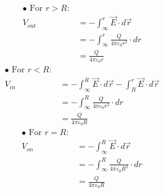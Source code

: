 	  \begin{align*}
	\bullet\text { For } r>R:\\
	V_{out}&=-\int_{\infty}^{r} \vec{E}\cdot d \vec{r}\\
	&=-\int_{\infty}^{r} \frac{Q}{4 \pi \varepsilon_{0} r^{2}}\cdot d {r}\\
	&=\frac{Q}{4 \pi \varepsilon_{0} r}
	\end{align*}
    \begin{align*}
 	\bullet	\text { For } r<R:\\
	V_{in}&=-\int_{\infty}^{R} \vec{E}\cdot d \vec{r}-\int_{R}^{r} \vec{E}\cdot d \vec{r}\\
	&=-\int_{\infty}^{R} \frac{Q}{4 \pi \varepsilon_{0} r^{2}} \cdot d {r}\\
	&=\frac{Q}{4 \pi \varepsilon_{0} R}
	\end{align*}
	 \begin{align*}
		\bullet \text { For } r=R:\\
	V_{on}&=-\int_{\infty}^{R} \vec{E}\cdot d \vec{r}\\
	&=-\int_{\infty}^{R} \frac{Q}{4 \pi \varepsilon_{0} R^{2}}\cdot d {r}\\
	&=\frac{Q}{4 \pi \varepsilon_{0} R}
	\end{align*}

\begin{center}
\end{center}
